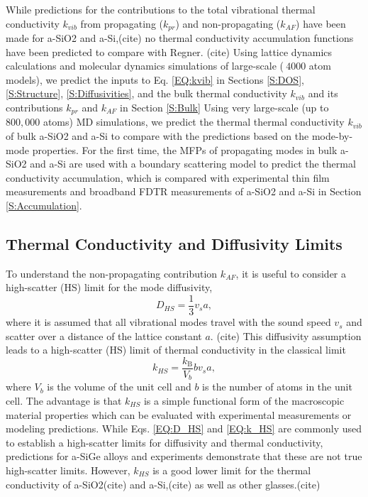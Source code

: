 \documentclass[aps,prb,onecolumn,preprint,superscriptaddress,footinbib,amsmath,amssymb,floatfix]{revtex4}
\begin{document}
While predictions for the contributions to the total 
vibrational thermal conductivity $k_{vib}$ from 
propagating ($k_{pr}$) and non-propagating ($k_{AF}$) have 
been made for a-SiO2 and a-Si,(cite) no thermal conductivity 
accumulation functions have been predicted to compare with Regner.
(cite) 
Using lattice dynamics calculations and molecular dynamics simulations 
of large-scale ($~4000$ atom models), 
we predict the inputs to Eq. \eqref{EQ:kvib} in Sections \ref{S:DOS}, 
\ref{S:Structure}, \ref{S:Diffusivities}, and the bulk thermal 
conductivity 
$k_{vib}$ and its contributions $k_{pr}$ and $k_{AF}$ in Section 
\ref{S:Bulk} 
Using very large-scale (up to $800,000$ atoms) 
MD simulations, we predict the thermal 
thermal conductivity $k_{vib}$ of bulk a-SiO2 and a-Si to compare with 
the predictions based on the mode-by-mode properties. 
For the first time, the MFPs of propagating modes in bulk 
a-SiO2 and a-Si are used with a boundary scattering model 
to predict the thermal conductivity accumulation, which is 
compared with experimental thin film measurements and broadband 
FDTR measurements of a-SiO2 and a-Si in Section \ref{S:Accumulation}.

\subsection{\label{S:Limits}Thermal Conductivity and Diffusivity Limits}

To understand the non-propagating contribution $k_{AF}$, it is useful 
to consider a high-scatter (HS) limit for the mode diffusivity,
\begin{equation}\label{EQ:D_HS}
D_{HS} = \frac{1}{3} v_s a,
\end{equation}
where it is assumed that all vibrational modes travel with the sound speed  
$v_s$ and scatter over a distance of the lattice constant $a$.
(cite) 
This diffusivity assumption leads to a high-scatter (HS) limit of 
thermal conductivity in the classical limit\cite{cahill_lattice_1988} 
\begin{equation}\label{EQ:k_HS}
k_{HS} = \frac{k_{\text{B}}}{V_b}b v_s a,
\end{equation}
where $V_b$ is the volume of the unit cell and $b$ is the number of atoms 
in the unit cell.\cite{cahill_lower_1992} 
The advantage is that $k_{HS}$ is a simple 
functional form of the macroscopic material properties which can 
be evaluated with experimental measurements or modeling predictions. 
While Eqs. \eqref{EQ:D_HS} and \eqref{EQ:k_HS} are commonly used to 
establish a high-scatter limits for 
diffusivity and thermal conductivity, predictions for a-SiGe alloys 
\cite{feldman_thermal_1993} and experiments 
demonstrate that these are not true high-scatter limits.  
However, $k_{HS}$ is a good lower limit for the thermal conductivity 
of a-SiO2(cite) 
and a-Si,(cite) 
as well as other glasses.(cite)
\end{document}
